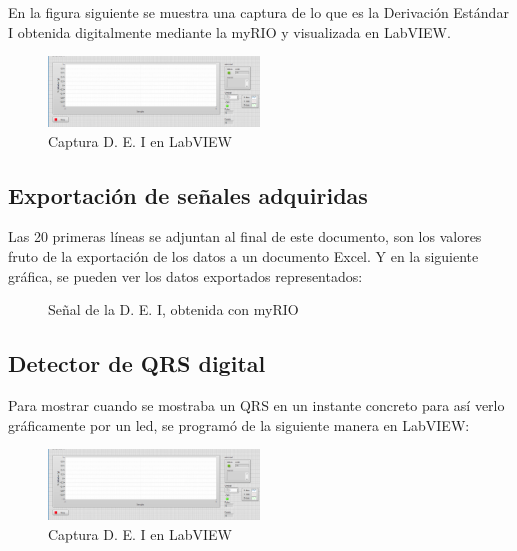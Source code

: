 \documentclass[conference]{IEEEtran}
\begin{document}
En la figura siguiente se muestra una captura de lo que es la Derivación Estándar I obtenida digitalmente mediante la myRIO y visualizada en LabVIEW.
\begin{figure}[H]
    \centerline{\includegraphics[width=0.5\textwidth]{e_captura.png}}
    \caption{Captura D. E. I en LabVIEW}
    \end{figure}

\subsection{Exportación de señales adquiridas}
Las 20 primeras líneas se adjuntan al final de este documento, son los valores fruto de la exportación de los datos a un documento Excel.
Y en la siguiente gráfica, se pueden ver los datos exportados representados:
\begin{figure}[H]
    \caption{Señal de la D. E. I, obtenida con myRIO}
    \label{g_myRIO}
    \end{figure}

\subsection{Detector de QRS digital}
Para mostrar cuando se mostraba un QRS en un instante concreto para así verlo gráficamente por un led, se programó de la siguiente manera en LabVIEW:
\begin{figure}[H]
    \centerline{\includegraphics[width=0.5\textwidth]{e_captura.png}}
    \caption{Captura D. E. I en LabVIEW}
    \end{figure}
\end{document}
